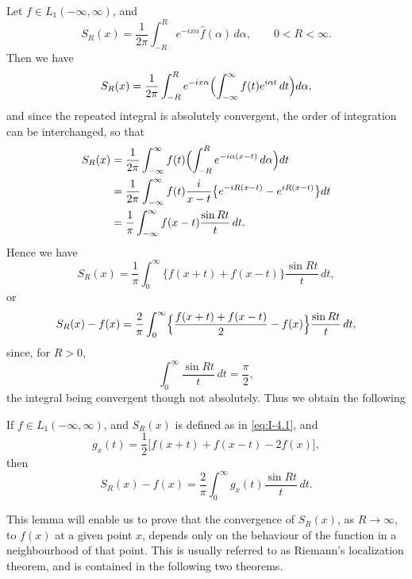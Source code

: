 Let $f\in L_1(-\infty,\infty)$, and
\begin{equation}\label{eq:I-4.1}
S_R(x)=\frac{1}{2\pi}\int_{-R}^{R}e^{-ix\alpha}\hat f(\alpha)\,d\alpha,
\qquad 0<R<\infty.
\end{equation}
Then we have
\begin{equation*}
S_R(x)=\frac{1}{2\pi}\int_{-R}^{R}e^{-ix\alpha}\Bigl(\int_{-\infty}^{\infty}f(t)e^{i\alpha t}\,dt\Bigr)d\alpha,
\end{equation*}
and since the repeated integral is absolutely convergent, the order of integration can be interchanged, so that
\begin{align*}
S_R(x)&=\frac{1}{2\pi}\int_{-\infty}^{\infty}f(t)\Bigl(\int_{-R}^{R}e^{-i\alpha(x-t)}\,d\alpha\Bigr)dt\\
&=\frac{1}{2\pi}\int_{-\infty}^{\infty}f(t)\frac{i}{x-t}\bigl\{e^{-iR(x-t)}-e^{iR(x-t)}\bigr\}dt\\
&=\frac{1}{\pi}\int_{-\infty}^{\infty}f(x-t)\frac{\sin Rt}{t}\,dt.
\end{align*}
Hence we have
\begin{equation}\label{eq:I-4.2}
S_R(x)=\frac{1}{\pi}\int_0^\infty\bigl\{f(x+t)+f(x-t)\bigr\}\frac{\sin Rt}{t}\,dt,
\end{equation}
or
\begin{equation*}
S_R(x)-f(x)=\frac{2}{\pi}\int_0^\infty
\Bigl\{\frac{f(x+t)+f(x-t)}{2}-f(x)\Bigr\}\frac{\sin Rt}{t}\,dt,
\end{equation*}
since, for $R>0$,
\begin{equation}\label{eq:I-4.3}
\int_0^\infty\frac{\sin Rt}{t}\,dt=\frac{\pi}{2},
\end{equation}
the integral being convergent though not absolutely. Thus we obtain the following

\begin{lemma}\label{lem:I-4.1}
If $f\in L_1(-\infty,\infty)$, and $S_R(x)$ is defined as in \eqref{eq:I-4.1}, and
\begin{equation}\label{eq:I-4.5}
g_x(t)=\frac12\bigl[f(x+t)+f(x-t)-2f(x)\bigr],
\end{equation}
then
\begin{equation*}
S_R(x)-f(x)=\frac{2}{\pi}\int_0^\infty g_x(t)\frac{\sin Rt}{t}\,dt.
\end{equation*}
\end{lemma}

This lemma will enable us to prove that the convergence of $S_R(x)$, as $R\to\infty$, to $f(x)$ at a given point $x$, depends only on the behaviour of the function in a neighbourhood of that point. This is usually referred to as Riemann's localization theorem, and is contained in the following two theorems.

